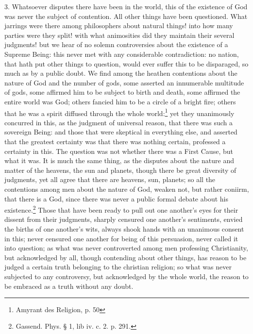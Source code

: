 \documentclass[a5paper]{book}
\begin{document}
3. Whatsoever disputes there have been in the world,
    this of the existence of God was never the subject of contention. 
All other things have been questioned.  %
What jarrings were there among philosophers about natural things! 
    into how many parties were they split! 
    with what animosities did they maintain their several judgments! 
    but we hear of no solemn controversies about the existence of a Supreme Being: 
    this never met with any considerable contradiction: 
    no nation, that hath put other things to question, 
    would ever suffer this to be disparaged, 
    so much as by a public doubt. 
We find among the heathen contentions about the nature of God 
    and the number of gods, 
    some asserted an innumerable multitude of gods,
    some affirmed him to be subject to birth and death, 
    some affirmed the entire world was God; 
    others fancied him to be a circle of a bright fire; 
    others that he was a spirit diffused through the whole world:\footnote{Amyrant des Religion, p. 50}
    yet they unanimously concurred in this, 
    as the judgment of universal reason, 
    that there was such a sovereign Being: 
    and those that were skeptical in everything else, 
    and asserted that the greatest certainty was that there was nothing certain, 
    professed a certainty in this. 
The question was not whether there was a First Cause, 
    but what it was. 
It is much the same thing, 
    as the disputes about the nature and matter of the heavens, 
    the sun and planets, 
    though there be great diversity of judgments, 
    yet all agree that there are heavens, sun, planets; 
    so all the contentions among men about the nature of God,
    weaken not, but rather coniirm, that there is a God, 
    since there was never a public formal debate about his existence.\footnote{Gassend. Phys. § 1, lib iv. c. 2. p. 291.}
Those that have been ready to pull out one another’s eyes 
    for their dissent from their judgments, 
    sharply censured one another’s sentiments, 
    envied the births of one another’s wits, 
    always shook hands with an unanimous consent in this; 
    never censured one another for being of this persuasion, 
    never called it into question; 
    as what was never controverted among men professing Christianity, 
    but acknowledged by all, 
    though contending about other things, 
    has reason to be judged a certain truth belonging to the christian religion; 
    so what was never subjected to any controversy, 
    but acknowledged by the whole world, 
    the reason to be embraced as a truth without any doubt.
\end{document}

